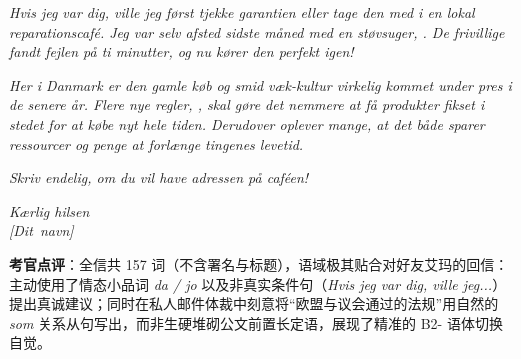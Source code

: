 \begin{answerbox}
\textit{Hvis jeg var dig, ville jeg først tjekke garantien eller tage den med i en lokal reparationscafé. Jeg var selv afsted sidste måned med en støvsuger, . De frivillige fandt fejlen på ti minutter, og nu kører den perfekt igen!}

\textit{Her i Danmark er den gamle køb og smid væk-kultur virkelig kommet under pres i de senere år. Flere nye regler, , skal gøre det nemmere at få produkter fikset i stedet for at købe nyt hele tiden. Derudover oplever mange, at det både sparer ressourcer og penge at forlænge tingenes levetid.}

\textit{Skriv endelig, om du vil have adressen på caféen!}

\textit{Kærlig hilsen\\
\mbox{[Dit navn]}}

\small\textbf{考官点评}：全信共 157 词（不含署名与标题），语域极其贴合对好友艾玛的回信：主动使用了情态小品词 \textit{da / jo} 以及非真实条件句（\textit{Hvis jeg var dig, ville jeg...}）提出真诚建议；同时在私人邮件体裁中刻意将“欧盟与议会通过的法规”用自然的 \textit{som} 关系从句写出，而非生硬堆砌公文前置长定语，展现了精准的 B2- 语体切换自觉。
\end{answerbox}

